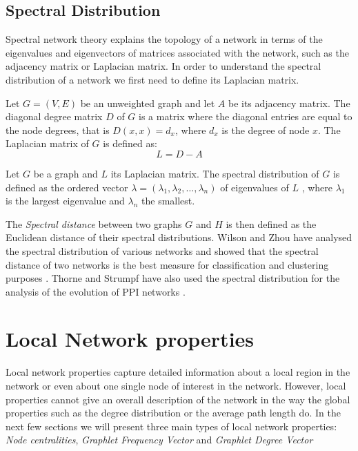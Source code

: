 \subsection{Spectral Distribution}

Spectral network theory explains the topology of a network in terms of the eigenvalues and eigenvectors of matrices associated with the network, such as the adjacency matrix or Laplacian matrix. In order to understand the spectral distribution of a network we first need to define its Laplacian matrix.

\begin{mydef}
 Let $G = (V,E)$ be an unweighted graph and let $A$ be its adjacency matrix. The diagonal degree matrix $D$ of $G$ is a matrix where the diagonal entries are equal to the node degrees, that is $D(x,x) = d_x$, where $d_x$ is the degree of node $x$. The Laplacian matrix of $G$ is defined as:
 $$ L = D - A$$
\end{mydef}

\begin{mydef}
 Let $G$ be a graph and $L$ its Laplacian matrix. The spectral distribution of $G$ is defined as the ordered vector $\lambda = (\lambda_1, \lambda_2, \dots, \lambda_n)$ of eigenvalues of $L$ , where $\lambda_1$ is the largest eigenvalue and $\lambda_n$ the smallest.
\end{mydef}


The \emph{Spectral distance} between two graphs $G$ and $H$ is then defined as the Euclidean distance of their spectral distributions. Wilson and Zhou have analysed the spectral distribution of various networks and showed that the spectral distance of two networks is the best measure for classification and clustering purposes \cite{wilson2008study}. Thorne and Strumpf have also used the spectral distribution for the analysis of the evolution of PPI networks \cite{thorne2012graph}.

\section{Local Network properties}

Local network properties capture detailed information about a local region in the network or even about one single node of interest in the network. However, local properties cannot give an overall description of the network in the way the global properties such as the degree distribution or the average path length do. In the next few sections we will
present three main types of local network properties: \emph{Node centralities}, \emph{Graphlet
Frequency Vector} and \emph{Graphlet Degree Vector}

